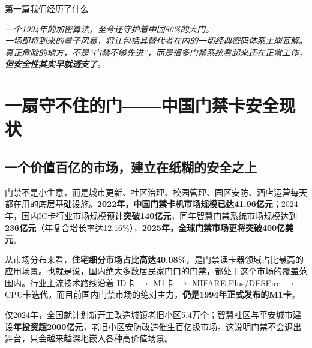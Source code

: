 \cleardoublepage
\thispagestyle{empty} %

\vspace*{6cm} %

\begin{center}
	{\heiti\erhao 第一篇\quad 我们经历了什么} 
	
	\vspace{2cm} %
	
	{\songti\xiaosi \textit{一个1994年的加密算法，至今还守护着中国80\%的大门。\\ [0.5em]一场即将到来的量子风暴，将让包括其替代者在内的一切经典密码体系土崩瓦解。\\ [0.5em]真正危险的地方，不是“门禁不够先进”，而是很多门禁系统看起来还在正常工作，\textbf{但安全性其实早就透支了}。}}
\end{center}

\vfill
\cleardoublepage %

\chapter{一扇守不住的门——中国门禁卡安全现状}

\section{一个价值百亿的市场，建立在纸糊的安全之上}

门禁不是小生意，而是城市更新、社区治理、校园管理、园区安防、酒店运营每天都在用的底层基础设施。\textbf{2022年，中国门禁卡机市场规模已达41.96亿元}；2024年，国内IC卡行业市场规模预计\textbf{突破140亿元}，同年智慧门禁系统市场规模达到\textbf{236亿元}（年复合增长率达12.16\%），\textbf{2025年，全球门禁市场更将突破400亿美元}。

从市场分布来看，\textbf{住宅细分市场占比高达40.08\%}，是门禁读卡器领域占比最高的应用场景。也就是说，国内绝大多数居民家门口的门禁，都处于这个市场的覆盖范围内。行业主流技术路线沿着 ID卡 $\rightarrow$ M1卡 $\rightarrow$ MIFARE Plus/DESFire $\rightarrow$ CPU卡迭代，而目前国内门禁市场的绝对主力，\textbf{仍是1994年正式发布的M1卡}。

仅2024年，全国就计划新开工改造城镇老旧小区5.4万个；智慧社区与平安城市建设\textbf{年投资超2000亿元}，老旧小区安防改造催生百亿级市场。这说明门禁不会退出舞台，只会越来越深地嵌入各种高价值场景。

